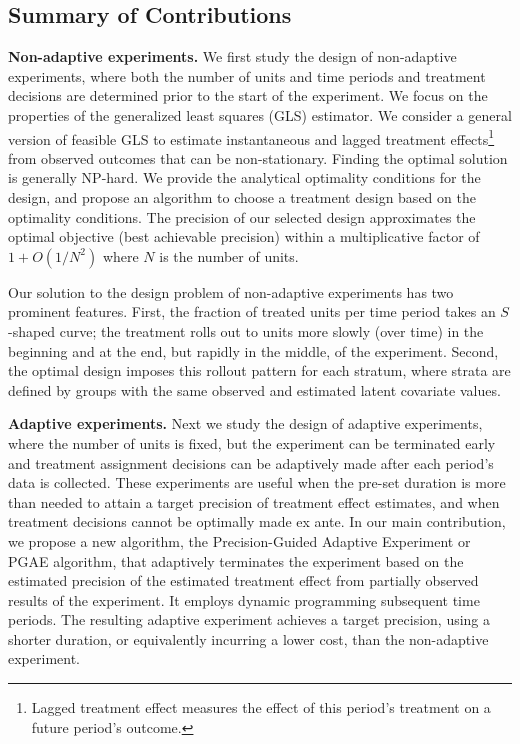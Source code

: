     \subsection{Summary of Contributions}
	

    {\bf Non-adaptive experiments. }	
    We first study the design of non-adaptive experiments, where both the number of units and time periods and treatment decisions are determined prior to the start of the experiment. We focus on  the properties of the generalized least squares (GLS) estimator.
    We consider a general version of feasible GLS to estimate instantaneous and lagged treatment effects\footnote{Lagged treatment effect measures the effect of this period's treatment on a future period's outcome.} from observed outcomes that can be non-stationary.
     Finding the optimal solution is generally NP-hard. We provide the analytical optimality conditions for the design, and propose an algorithm to choose a treatment design based on the optimality conditions. The precision of our selected design approximates the optimal objective (best achievable precision) within a multiplicative factor of $1+O(1/N^2)$ where $N$ is the number of units.
    
	Our solution to the design problem of non-adaptive experiments has two prominent features. First, the fraction of treated units per time period takes an $S$-shaped curve; the treatment rolls out to units more slowly (over time) in the beginning and at the end, but rapidly in the middle, of the experiment. Second, the optimal design imposes this rollout pattern for each stratum, where strata are defined by groups with the same observed and estimated latent covariate values. 
    
    
	{\bf Adaptive experiments.}
	Next we study the design of adaptive experiments, where the number of units is fixed, but  the experiment can be terminated early and treatment assignment decisions can be adaptively made after each period's data is collected. These experiments are useful when the pre-set duration is more than needed to attain a target precision of treatment effect estimates, and when treatment decisions cannot be optimally made ex ante.  In our main contribution,
	we propose a new algorithm, the  Precision-Guided Adaptive Experiment or PGAE algorithm, that  adaptively terminates the experiment based on the estimated precision of the estimated treatment effect from partially observed results of the experiment. It employs dynamic programming    subsequent time periods. The resulting adaptive experiment achieves a target precision, using a shorter duration, or equivalently incurring a lower cost, than the non-adaptive experiment. 
    
